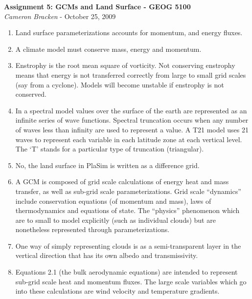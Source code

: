 \documentclass[11pt,oneside]{article}
\begin{document}
\begin{center}
	\textbf{Assignment 5: GCMs and Land Surface - GEOG 5100}\\
	{\itshape Cameron Bracken} - October 25, 2009
\end{center}


\begin{enumerate}

\item Land surface parameterizations accounts for momentum, and energy fluxes. 

\item A climate model must conserve mass, energy and momentum. 

\item Enstrophy is the root mean square of vorticity.  Not conserving enstrophy means that energy is not transferred correctly from large to small grid scales (say from a cyclone).  Models will become unstable if enstrophy is not conserved. 

\item In a spectral model values over the surface of the earth are represented as an infinite series of wave functions. Spectral truncation occurs when any number of waves less than infinity are used to represent a value.  A T21 model uses 21 waves to represent each variable in each latitude zone at each vertical level.   The `T' stands for a particular type of truncation (triangular).

\item No, the land surface in PlaSim is written as a difference grid. 

\item A GCM is composed of grid scale calculations of energy heat and mass transfer, as well as sub-grid scale parameterizations.  Grid scale ``dynamics'' include conservation equations (of momentum and mass), laws of thermodynamics and equations of state. The ``physics'' phenomenon which are to small to model explicitly (such as individual clouds) but are nonetheless represented through parameterizations. 

\item One way of simply representing clouds is as a semi-transparent layer in the vertical direction that has its own albedo and transmissivity. 

\item Equations 2.1 (the bulk aerodynamic equations) are intended to represent sub-grid scale heat and momentum fluxes.  The large scale variables which go into these calculations are wind velocity and temperature gradients. 


\end{enumerate}
\end{document}
